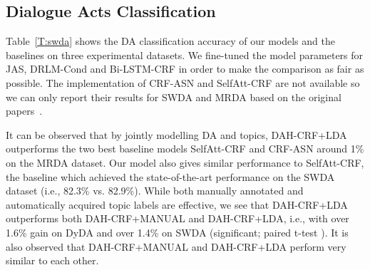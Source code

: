 \documentclass[11pt,a4paper]{article}
\begin{document}
\begin{table}[tb] 
  \caption{DA classification accuracy.  
   indicates the results which are reported from the prior publications.}
  \label{T:swda}
\end{table}


\subsection{Dialogue Acts Classification}
Table~\ref{T:swda} shows the DA classification accuracy of our models and the baselines on three experimental datasets. We fine-tuned the model parameters for JAS, DRLM-Cond and Bi-LSTM-CRF in order to make the comparison as fair as possible. The implementation of CRF-ASN and SelfAtt-CRF are not available so we can only report their results for SWDA and MRDA based on the original papers~\cite{chen2018dialogue,raheja2019dialogue}. 


It can be observed that by jointly modelling DA and topics,
DAH-CRF+LDA outperforms the two best baseline models  SelfAtt-CRF and CRF-ASN  around 1\% on the MRDA dataset.
Our model also gives similar performance to SelfAtt-CRF, the baseline which achieved the state-of-the-art performance on the SWDA dataset (i.e., 82.3\% vs. 82.9\%). 
While both manually annotated and automatically acquired topic labels are effective, we see that DAH-CRF+LDA  outperforms both  DAH-CRF+MANUAL and DAH-CRF+LDA, i.e., with over 1.6\% gain on  DyDA and over 1.4\% on SWDA  (significant; paired t-test ). It is also observed that DAH-CRF+MANUAL and DAH-CRF+LDA perform very similar to each other. 
\end{document}
